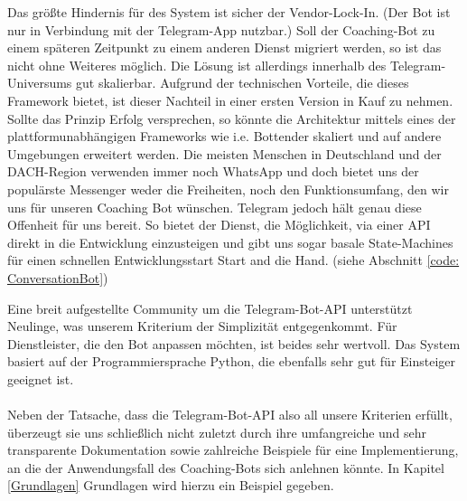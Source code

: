         Das größte Hindernis für des System ist sicher der Vendor-Lock-In. (Der Bot ist nur in Verbindung mit der Telegram-App nutzbar.) Soll der Coaching-Bot zu einem späteren Zeitpunkt zu einem anderen Dienst migriert werden, so ist das nicht ohne Weiteres möglich. Die Lösung ist allerdings innerhalb des Telegram-Universums gut skalierbar. Aufgrund der technischen Vorteile, die dieses Framework bietet, ist dieser Nachteil in einer ersten Version in Kauf zu nehmen. Sollte das Prinzip Erfolg versprechen, so könnte die Architektur mittels eines der plattformunabhängigen Frameworks wie i.e. Bottender skaliert und auf andere Umgebungen erweitert werden.
        Die meisten Menschen in Deutschland und der DACH-Region verwenden immer noch WhatsApp \cite{Nutzerzahlen} und doch bietet uns der populärste Messenger weder die Freiheiten, noch den Funktionsumfang, den wir uns für unseren Coaching Bot wünschen. Telegram jedoch hält genau diese Offenheit für uns bereit. \cite{telegramVergleich} So bietet der Dienst, die Möglichkeit, via einer API direkt in die Entwicklung einzusteigen und gibt uns sogar basale State-Machines für einen schnellen Entwicklungsstart Start and die Hand. (siehe Abschnitt \ref*{code: ConversationBot})
        
        Eine breit aufgestellte Community um die Telegram-Bot-API unterstützt Neulinge, was unserem Kriterium der Simplizität entgegenkommt. Für Dienstleister, die den Bot anpassen möchten, ist beides sehr wertvoll. Das System basiert auf der Programmiersprache Python, die ebenfalls sehr gut für Einsteiger geeignet ist. \\ \\
        
        Neben der Tatsache, dass die Telegram-Bot-API also all unsere Kriterien erfüllt, überzeugt sie uns schließlich nicht zuletzt durch ihre umfangreiche und sehr transparente Dokumentation sowie zahlreiche Beispiele für eine Implementierung, an die der Anwendungsfall des Coaching-Bots sich anlehnen könnte. In Kapitel \ref*{Grundlagen} Grundlagen wird hierzu ein Beispiel gegeben.

        
         
    